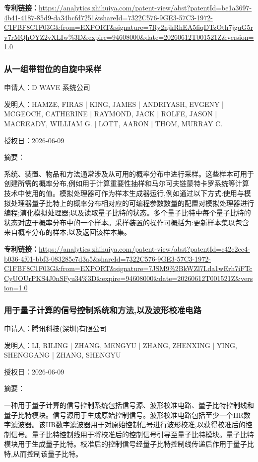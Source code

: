 \documentclass[12pt,a4paper]{ctexart}
\begin{document}
\noindent\textbf{专利链接：}\url{https://analytics.zhihuiya.com/patent-view/abst?patentId=be1a3697-4b41-4187-85d9-da34bcfd7251&shareId=7322C576-9GE3-57C3-1972-C1FBF8C1F03G&from=EXPORT&signature=7Ry2njkRhEA5fiqDTzOth7jguG5rv7rMQhOYZ2vXLIw%3D&expire=94608000&date=20260612T001521Z&version=1.0}

\subsubsection{ 从一组带钳位的自旋中采样 }

申请人：D WAVE 系统公司

发明人：HAMZE, FIRAS | KING, JAMES | ANDRIYASH, EVGENY | MCGEOCH, CATHERINE | RAYMOND, JACK | ROLFE, JASON | MACREADY, WILLIAM G. | LOTT, AARON | THOM, MURRAY C.

授权日：2026-06-09

摘要：

系统、装置、物品和方法通常涉及从可用的概率分布中进行采样。这些样本可用于创建所需的概率分布,例如用于计算重要性抽样和马尔可夫链蒙特卡罗系统等计算技术中使用的值。模拟处理器可作为样本生成器运行,例如通过以下方式:使用与模拟处理器量子比特上的概率分布相对应的可编程参数数量的配置对模拟处理器进行编程;演化模拟处理器;以及读取量子比特的状态。多个量子比特中每个量子比特的状态对应于概率分布中的一个样本。采样装置的操作可概括为:更新样本集以包含来自概率分布的样本;以及返回该样本集。

\noindent\textbf{专利链接：}\url{https://analytics.zhihuiya.com/patent-view/abst?patentId=c42c2ec4-b036-4f01-bbf3-083285c7d3a5&shareId=7322C576-9GE3-57C3-1972-C1FBF8C1F03G&from=EXPORT&signature=7JSM9%2BkWZl7Lda1wErh7iFTcCyUOUrPKS4J0nSFyu34%3D&expire=94608000&date=20260612T001521Z&version=1.0}

\subsubsection{ 用于量子计算的信号控制系统和方法,以及波形校准电路 }

申请人：腾讯科技(深圳)有限公司

发明人：LI, RILING | ZHANG, MENGYU | ZHANG, ZHENXING | YING, SHENGGANG | ZHANG, SHENGYU

授权日：2026-06-09

摘要：

一种用于量子计算的信号控制系统包括信号源、波形校准电路、量子比特控制线和量子比特模块。信号源用于生成原始控制信号。波形校准电路包括至少一个IIR数字滤波器。该IIR数字滤波器用于对原始控制信号进行波形校准,以获得校准后的控制信号。量子比特控制线用于将校准后的控制信号引导至量子比特模块。量子比特模块用于生成量子比特。校准后的控制信号经量子比特控制线传递后作用于量子比特,从而控制该量子比特。
\end{document}
